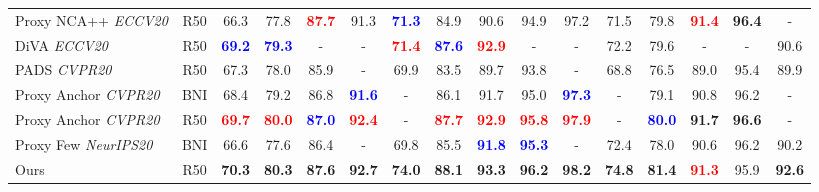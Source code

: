 \documentclass{article}
\begin{document}
\begin{table*}
{\begin{tabular}{@{}l|c|ccccc|ccccc|cccc@{}}
Proxy NCA++ \cite{DBLP:journals/corr/abs-2004-01113} \textit{ECCV20} & R50 & 66.3 & 77.8 & \textbf{\textcolor{red}{87.7}} & 91.3 & \textbf{\textcolor{blue}{71.3}} & 84.9 & 90.6 & 94.9 & 97.2 & 71.5 & 79.8 & \textbf{\textcolor{red}{91.4}} & \textbf{96.4} & - \\

DiVA \cite{DBLP:conf/eccv/MilbichRBSBOC20} \textit{ECCV20} & R50 & \textbf{\textcolor{blue}{69.2}} & \textbf{\textcolor{blue}{79.3}} & - & - & \textbf{\textcolor{red}{71.4}} & \textbf{\textcolor{blue}{87.6}}  & \textbf{\textcolor{red}{92.9}} & - & - & 72.2 & 79.6 & - & - & 90.6 \\

PADS \cite{DBLP:conf/cvpr/RothMO20} \textit{CVPR20} & R50 & 67.3  & 78.0  & 85.9 & - & 69.9 & 83.5 & 89.7 & 93.8 & - & 68.8 & 76.5  & 89.0 &  95.4 & 89.9 \\

Proxy Anchor \cite{DBLP:conf/cvpr/KimKCK20} \textit{CVPR20} & BNI & 68.4 & 79.2 & 86.8 & \textbf{\textcolor{blue}{91.6}} & -  & 86.1 & 91.7 & 95.0 & \textbf{\textcolor{blue}{97.3}} & -  & 79.1 & 90.8 & 96.2 & - \\

Proxy Anchor \cite{DBLP:conf/cvpr/KimKCK20} \textit{CVPR20} & R50 & \textbf{\textcolor{red}{69.7}} & \textbf{\textcolor{red}{80.0}} & \textbf{\textcolor{blue}{87.0}} & \textbf{\textcolor{red}{92.4}} & -  & \textbf{\textcolor{red}{87.7}} & \textbf{\textcolor{red}{92.9}} & \textbf{\textcolor{red}{95.8}} & \textbf{\textcolor{red}{97.9}} & -  & \textbf{\textcolor{blue}{80.0}} & \textbf{91.7} & \textbf{96.6} & - \\

Proxy Few \cite{DBLP:journals/corr/abs-2010-13636} \textit{NeurIPS20} & BNI & 66.6 & 77.6 & 86.4 & - & 69.8 & 85.5 & \textbf{\textcolor{blue}{91.8}} & \textbf{\textcolor{blue}{95.3}} & - & 72.4 & 78.0 & 90.6 & 96.2 & 90.2 \\ \hline










Ours & R50 & \textbf{70.3} & \textbf{80.3} & \textbf{87.6} & \textbf{92.7} & \textbf{74.0} & \textbf{88.1} & \textbf{93.3} & \textbf{96.2} & \textbf{98.2} & \textbf{74.8} & \textbf{81.4} & \textbf{\textcolor{red}{91.3}} & 95.9 & \textbf{92.6} \\ \hline



\end{tabular}}


\end{table*}
\end{document}
